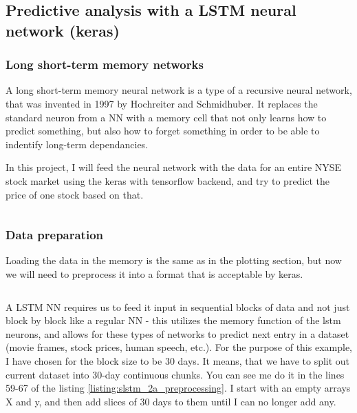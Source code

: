 \documentclass[12pt, a4paper]{article}
\begin{document}
\subsection{Predictive analysis with a LSTM neural network (keras)}
\subsubsection{Long short-term memory networks}

A long short-term memory neural network is a type of a recursive neural network, that was invented in 1997 by Hochreiter and Schmidhuber\cite{hochreiter1997long}. It replaces the standard neuron from a NN with a memory cell that not only learns how to predict something, but also how to forget something in order to be able to indentify long-term dependancies.

In this project, I will feed the neural network with the data for an entire NYSE stock market using the keras\cite{chollet2015keras} with tensorflow\cite{abadi2016tensorflow} backend, and try to predict the price of one stock based on that.


\bgroup
  \inputminted[linenos, breaklines=true, fontsize=\scriptsize]{python}{src/stocks/lstm/0_imports.py}
  \label{listing:slstm_0_imports}
\egroup

\subsubsection{Data preparation}

Loading the data in the memory is the same as in the plotting section, but now we will need to preprocess it into a format that is acceptable by keras.

\bgroup
  \inputminted[linenos, breaklines=true, fontsize=\scriptsize, firstnumber=last]{python}{src/stocks/lstm/1_data.py}
  \label{listing:slstm_1_data}
\egroup



A LSTM NN requires us to feed it input in sequential blocks of data and not just block by block like a regular NN - this utilizes the memory function of the lstm neurons, and allows for these types of networks to predict next entry in a dataset (movie frames, stock prices, human speech, etc.). For the purpose of this example, I have chosen for the block size to be 30 days. It means, that we have to split out current dataset into 30-day continuous chunks. You can see me do it in the lines 59-67 of the listing \ref{listing:slstm_2a_preprocessing}. I start with an empty arrays X and y, and then add slices of 30 days to them until I can no longer add any.
\end{document}

